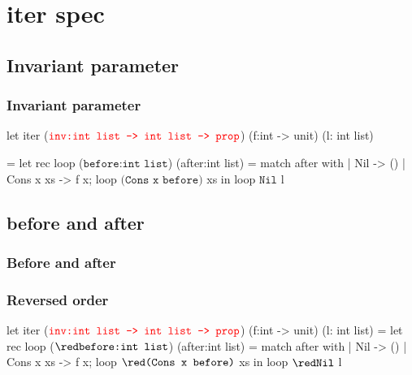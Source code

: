 \documentclass[xcolor=dvipsnames]{beamer}
\begin{document}
\section*{iter spec}
\subsection*{Invariant parameter}
\begin{frame}[fragile]
\frametitle{Invariant parameter}
\hspace*{-1em}
\begin{whycode}
let iter ($\textcolor{red}{\texttt{inv:int list -> int list -> prop}}$) 
(f:int -> unit) (l: int list)
\end{whycode}\vspace*{-1em}\begin{whygray} 
= let rec loop (${ \texttt{before:int list}}$) (after:int list)
  = match after with
     | Nil       -> ()
     | Cons x xs -> f x; loop ${ \texttt{(Cons x before)}}$ xs
  in loop ${\texttt{Nil}}$ l
\end{whygray}
\end{frame}
\addtocounter{framenumber}{-1}

\subsection*{before and after}
\begin{frame}[fragile]
\frametitle<1>{Before and after}
\frametitle<2->{Reversed order}
\hspace*{-1em}
\begin{whycode}
let iter ($\textcolor{red}{\texttt{inv:int list -> int list -> prop}}$) 
(f:int -> unit) (l: int list)
= let rec loop (${\red \texttt{before:int list}}$) (after:int list)
  = match after with
     | Nil       -> ()
     | Cons x xs -> f x; loop ${\red \texttt{(Cons x before)}}$ xs
  in loop ${\red\texttt{Nil}}$ l
\end{whycode}

%
\end{frame}
\addtocounter{framenumber}{-1}
\end{document}
